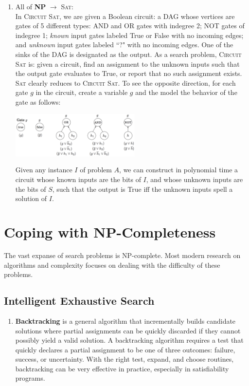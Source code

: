 \documentclass[10pt]{article}
\begin{document}
\begin{multicols}{2}
\begin{addmargin}[0.8em]{0.5em}
\begin{enumerate}[label=(\alph*)]
        \item All of \textbf{NP} $\rightarrow$ \textsc{Sat}: \\
        In \textsc{Circuit Sat}, we are given a Boolean circuit: a DAG whose vertices are gates of 5 different types: \textsc{AND} and \textsc{OR} gates with indegree 2; \textsc{NOT} gates of indegree 1; \textit{known} input gates labeled True or False with no incoming edges; and \textit{unknown} input gates labeled ``?" with no incoming edges. One of the sinks of the DAG is designated as the output. As a search problem, \textsc{Circuit Sat} is: given a circuit, find an assignment to the unknown inputs such that the output gate evaluates to True, or report that no such assignment exists. \textsc{Sat} clearly reduces to \textsc{Circuit Sat}. To see the opposite direction, for each gate $g$ in the circuit, create a variable $g$ and the model the behavior of the gate as follows:
        \begin{center}
        \includegraphics[width=6.5cm]{circuit_sat.png}
        \end{center}
        Given any instance $I$ of problem $A$, we can construct in polynomial time a circuit whose known inputs are the bits of $I$, and whose unknown inputs are the bits of $S$, such that the output is True iff the unknown inputs spell a solution of $I$.
        
    \end{enumerate}    
\end{addmargin}

\section{Coping with NP-Completeness}
\begin{addmargin}[0.8em]{0.5em}
The vast expanse of search problems is NP-complete. Most modern research on algorithms and complexity focuses on dealing with the difficulty of these problems.
    \subsection{Intelligent Exhaustive Search}
    \begin{enumerate}[label=(\alph*)]
        \item \textbf{Backtracking} is a general algorithm that incrementally builds candidate solutions where partial assignments can be quickly discarded if they cannot possibly yield a valid solution. A backtracking algorithm requires a test that quickly declares a partial assignment to be one of three outcomes: failure, success, or uncertainty. With the right test, expand, and choose routines, backtracking can be very effective in practice, especially in satisfiability programs.
        

\end{enumerate}
\end{addmargin}
\end{multicols}
\end{document}
